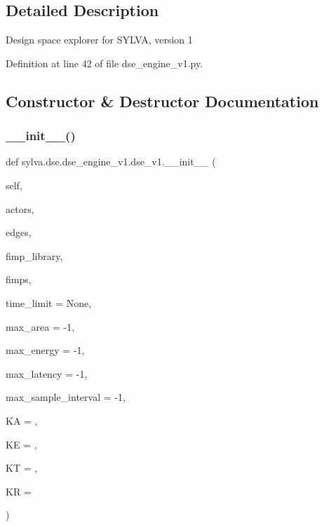 \subsection{Detailed Description}
\begin{DoxyVerb}  Design space explorer for SYLVA, version 1
\end{DoxyVerb}
 

Definition at line 42 of file dse\+\_\+engine\+\_\+v1.\+py.



\subsection{Constructor \& Destructor Documentation}
\mbox{\label{classsylva_1_1dse_1_1dse__engine__v1_1_1dse__v1_a918479438f80d4a9fa13f473cf8410c5}} 
\subsubsection{\texorpdfstring{\+\_\+\+\_\+init\+\_\+\+\_\+()}{\_\_init\_\_()}}
{\footnotesize\ttfamily def sylva.\+dse.\+dse\+\_\+engine\+\_\+v1.\+dse\+\_\+v1.\+\_\+\+\_\+init\+\_\+\+\_\+ (\begin{DoxyParamCaption}\item[{}]{self,  }\item[{}]{actors,  }\item[{}]{edges,  }\item[{}]{fimp\+\_\+library,  }\item[{}]{fimps,  }\item[{}]{time\+\_\+limit = {\ttfamily None},  }\item[{}]{max\+\_\+area = {\ttfamily -\/1},  }\item[{}]{max\+\_\+energy = {\ttfamily -\/1},  }\item[{}]{max\+\_\+latency = {\ttfamily -\/1},  }\item[{}]{max\+\_\+sample\+\_\+interval = {\ttfamily -\/1},  }\item[{}]{KA = {},  }\item[{}]{KE = {},  }\item[{}]{KT = {},  }\item[{}]{KR = {} }\end{DoxyParamCaption})}



